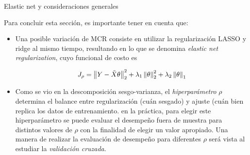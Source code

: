 \documentclass[9pt]{beamer}
\begin{document}
\begin{frame}{Elastic net y consideraciones generales}

Para concluir esta sección, es importante tener en cuenta que:

\begin{itemize}
	\item Una posible variación de MCR consiste en utilizar la regularización LASSO y ridge al mismo tiempo, resultando en lo que se denomina \emph{elastic net regularization}, cuyo funcional de costo es

\begin{equation*}
	J_\rho = \left\lVert Y-\tilde{X}\theta\right\rVert_2^2 + \lambda_1\left\lVert\theta\right\rVert_2^2 + \lambda_2\left\lVert\theta\right\rVert_1
\end{equation*} \pause

	\item Como se vio en la descomposición sesgo-varianza, el \emph{hiperparámetro} $\rho$ determina el balance entre regularización (cuán  sesgado) y ajuste (cuán bien replica  los datos de entrenamiento. en la práctica, para elegir este hiperparámetro se puede evaluar el desempeño fuera de muestra para distintos valores de $\rho$ con la finalidad de elegir un valor apropiado. Una manera de realizar la evaluación de desempeño para diferentes $\rho$ será vista al estudiar la \emph{validación cruzada}.
\end{itemize}

	
\end{frame}
\end{document}
